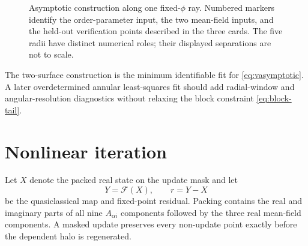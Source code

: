 \documentclass[11pt,a4paper]{article}
\newcommand{\Fmap}{\mathcal{F}}
\begin{document}
\begin{figure}[p]
\caption{Asymptotic construction along one fixed-$\phi$ ray.  Numbered
markers identify the order-parameter input, the two mean-field inputs, and
the held-out verification points described in the three cards.  The five
radii have distinct numerical roles; their displayed separations are not to
scale.}
\label{fig:asymptotic-extraction}
\end{figure}

\clearpage

The two-surface construction is the minimum identifiable fit for
\eqref{eq:vasymptotic}.  A later overdetermined annular least-squares fit should
add radial-window and angular-resolution diagnostics without relaxing the
block constraint \eqref{eq:block-tail}.



\section{Nonlinear iteration}

Let $X$ denote the packed real state on the update mask and let
\begin{equation}
  Y=\Fmap(X),\qquad r=Y-X
  \label{eq:fixedpoint}
\end{equation}
be the quasiclassical map and fixed-point residual.  Packing contains the real
and imaginary parts of all nine $A_{\alpha i}$ components followed by the
three real mean-field components.  A masked update preserves every non-update
point exactly before the dependent halo is regenerated.
\end{document}
